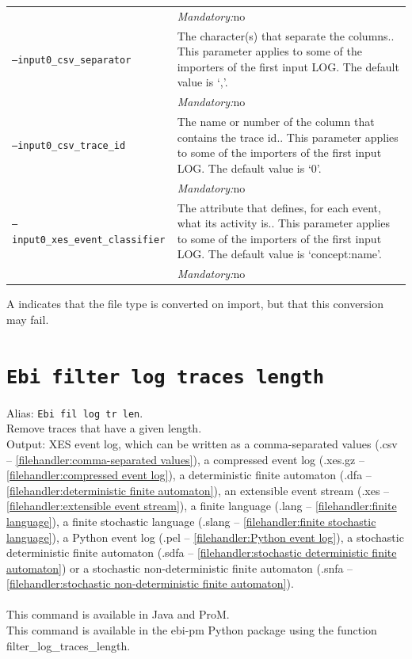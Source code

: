 {\begin{tabularx}{\linewidth}{lX}
&\textit{Mandatory:}\quad no\\
\texttt{--input0\_csv\_separator} & The character(s) that separate the columns.. This parameter applies to some of the importers of the first input LOG. The default value is `,'.\\
&\textit{Mandatory:}\quad no\\
\texttt{--input0\_csv\_trace\_id} & The name or number of the column that contains the trace id.. This parameter applies to some of the importers of the first input LOG. The default value is `0'.\\
&\textit{Mandatory:}\quad no\\
\texttt{--input0\_xes\_event\_classifier} & The attribute that defines, for each event, what its activity is.. This parameter applies to some of the importers of the first input LOG. The default value is `concept:name'.\\
&\textit{Mandatory:}\quad no\\
\bottomrule
\end{tabularx}
A \textdagger{} indicates that the file type is converted on import, but that this conversion may fail.
\clearpage\section{\texttt{Ebi filter log traces length}}
\label{command:Ebi filter log traces length}
Alias: \texttt{Ebi fil log tr len}.\\
Remove traces that have a given length.\\
\noindent Output: XES event log, which can be written as a comma-separated values (.csv -- \cref{filehandler:comma-separated values}), a compressed event log (.xes.gz -- \cref{filehandler:compressed event log}), a deterministic finite automaton (.dfa -- \cref{filehandler:deterministic finite automaton}), an extensible event stream (.xes -- \cref{filehandler:extensible event stream}), a finite language (.lang -- \cref{filehandler:finite language}), a finite stochastic language (.slang -- \cref{filehandler:finite stochastic language}), a Python event log (.pel -- \cref{filehandler:Python event log}), a stochastic deterministic finite automaton (.sdfa -- \cref{filehandler:stochastic deterministic finite automaton}) or a stochastic non-deterministic finite automaton (.snfa -- \cref{filehandler:stochastic non-deterministic finite automaton}).\\
\\This command is available in Java and ProM.
\\This command is available in the ebi-pm Python package using the function filter\_log\_traces\_length.
}
